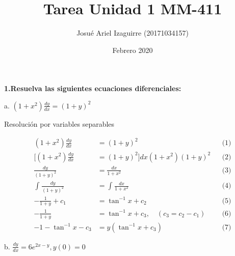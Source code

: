 \documentclass{article}
\title{Tarea Unidad 1 MM-411}
\author{Josué Ariel Izaguirre (20171034157)}
\date{Febrero 2020}
\begin{document}
    \maketitle
    \begin{flushleft}
        \textbf{1.Resuelva las siguientes ecuaciones diferenciales:} \break
        
        
        \hspace{10mm} a. $
            \left( 1+x^2 \right) \frac{dy}{dx} = \left(1+y \right)^2
            $  \break

            \hspace{10mm} Resolución por variables separables \break

                \begin{align*} \label{1.a}
                    ( 1+x^2 ) \frac{dy}{dx} & = (1+y )^2  &&\text{(1)}\\
                    [ ( 1+x^2 ) \frac{dy}{dx} & = (1+y)^2 ] {dx}{(1+x^2)(1+y)^2} &&\text{(2)}\\
                    \frac{dy}{(1+y)^2} & = \frac{dx}{1+x^2} &&\text{(3)}\\
                    \int_{}^{} \frac{dy}{(1+y)^2} & = \int_{}^{} \frac{dx}{1+x^2} &&\text{(4)}\\
                    -\frac{1}{1+y} + c_1 & = \tan ^ {-1} {x} + c_2 &&\text{(5)}\\
                    -\frac{1}{1+y} & = \tan ^ {-1} {x} + c_3, \quad (c_3 = c_2 - c_1) &&\text{(6)} \\
                    -1 - \tan ^ {-1} {x} - c_3 & = y ( \tan ^ {-1} {x} + c_{3} ) &&\text{(7)}
                \end{align*}

        \hspace{10mm} b. $
            \frac{dy}{dx} = 6e^{2x-y} , y(0) = 0
            $  \break
    \end{flushleft}
\end{document}
